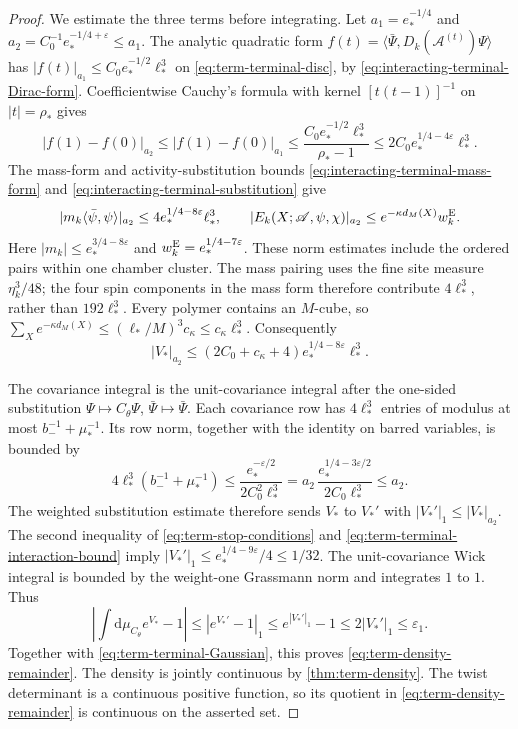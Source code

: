 \documentclass[11pt,letterpaper,reqno]{amsart}
\newcommand{\dd}{\mathrm d}
\begin{document}
\begin{proof}
We estimate the three terms before integrating.
Let $a_1=e_*^{-1/4}$ and
$a_2=C_0^{-1}e_*^{-1/4+\varepsilon}\le a_1$.
The analytic quadratic form
$f(t)=\langle\bar\Psi,D_k(\mathscr A^{(t)})\Psi\rangle$
has $|f(t)|_{a_1}\le C_0e_*^{-1/2}\ell_*^3$ on
\eqref{eq:term-terminal-disc}, by
\eqref{eq:interacting-terminal-Dirac-form}.
Coefficientwise Cauchy's formula with kernel
$[t(t-1)]^{-1}$ on $|t|=\rho_*$ gives
\[
 |f(1)-f(0)|_{a_2}
 \le |f(1)-f(0)|_{a_1}
 \le\frac{C_0e_*^{-1/2}\ell_*^3}{\rho_*-1}
                  \le2C_0e_*^{1/4-4\varepsilon}\ell_*^3 .
\]
The mass-form and activity-substitution bounds
\eqref{eq:interacting-terminal-mass-form} and
\eqref{eq:interacting-terminal-substitution} give
\[
 |m_k\langle\bar\psi,\psi\rangle|_{a_2}
                \le4e_*^{1/4-8\varepsilon}\ell_*^3,\qquad
 |E_k(X;\mathscr A,\psi,\chi)|_{a_2}
                 \le e^{-\kappa d_M(X)}w_k^{\rm E}.
\]
Here $|m_k|\le e_*^{3/4-8\varepsilon}$ and
$w_k^{\rm E}=e_*^{1/4-7\varepsilon}$.
These norm estimates include the ordered pairs within
one chamber cluster. The mass pairing uses the fine site measure
$\eta_k^3/48$;
the four spin components in the mass form therefore
contribute $4\ell_*^3$, rather than $192\ell_*^3$.
Every polymer contains an $M$-cube, so
$\sum_Xe^{-\kappa d_M(X)}
\le(\ell_*/M)^3c_\kappa\le c_\kappa\ell_*^3$.
Consequently
\begin{equation}\label{eq:term-terminal-interaction-bound}
 |V_*|_{a_2}\le
            (2C_0+c_\kappa+4)e_*^{1/4-8\varepsilon}\ell_*^3.
\end{equation}

The covariance integral is the unit-covariance integral
after the one-sided substitution
$\Psi\mapsto C_\theta\Psi$, $\bar\Psi\mapsto\bar\Psi$.
Each covariance row has $4\ell_*^3$ entries of modulus
at most $b_-^{-1}+\mu_*^{-1}$.
Its row norm, together with the identity on barred
variables, is bounded by
\[
 4\ell_*^3(b_-^{-1}+\mu_*^{-1})
 \le\frac{e_*^{-\varepsilon/2}}{2C_0^2\ell_*^3}
 =a_2\,\frac{e_*^{1/4-3\varepsilon/2}}{2C_0\ell_*^3}
 \le a_2.
\]
The weighted substitution estimate therefore sends
$V_*$ to $V_*'$ with $|V_*'|_1\le|V_*|_{a_2}$.
The second inequality of \eqref{eq:term-stop-conditions}
and \eqref{eq:term-terminal-interaction-bound} imply
$|V_*'|_1\le e_*^{1/4-9\varepsilon}/4\le1/32$.
The unit-covariance Wick integral is bounded by the
weight-one Grassmann norm and integrates $1$ to $1$.
Thus
\[
 \left|\int\dd\mu_{C_\theta}e^{V_*}-1\right|
 \le |e^{V_*'}-1|_1
 \le e^{|V_*'|_1}-1
 \le2|V_*'|_1\le\varepsilon_1.
\]
Together with \eqref{eq:term-terminal-Gaussian}, this
proves \eqref{eq:term-density-remainder}.
The density is jointly continuous by
\cref{thm:term-density}. The twist determinant
is a continuous positive function, so its quotient
in \eqref{eq:term-density-remainder} is continuous
on the asserted set.
\end{proof}
\end{document}
